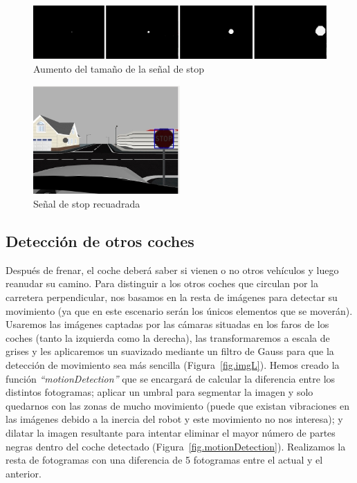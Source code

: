 \begin{figure}[H]
  \begin{center}
    \includegraphics[width=1.0\textwidth]{figures/Stop/brake.jpg}
		\caption{Aumento del tamaño de la señal de stop}
		\label{fig.brake}
		\end{center}
\end{figure}

\begin{figure}[H]
  \begin{center}
    \includegraphics[width=0.5\textwidth]{figures/Stop/stopRecuadro.jpg}
		\caption{Señal de stop recuadrada}
		\label{fig.stopRecuadro}
		\end{center}
\end{figure}

\subsection{Detección de otros coches}
Después de frenar, el coche deberá saber si vienen o no otros vehículos y luego reanudar su camino. Para distinguir a los otros coches que circulan por la carretera perpendicular, nos basamos en la resta de imágenes para detectar su movimiento (ya que en este escenario serán los únicos elementos que se moverán). Usaremos las imágenes captadas por las cámaras situadas en los faros de los coches (tanto la izquierda como la derecha), las transformaremos a escala de grises y les aplicaremos un suavizado mediante un filtro de Gauss para que la detección de movimiento sea más sencilla (Figura~\ref{fig.imgL}). Hemos creado la función \textit{``motionDetection''} que se encargará de calcular la diferencia entre los distintos fotogramas; aplicar un umbral para segmentar la imagen y solo quedarnos con las zonas de mucho movimiento (puede que existan vibraciones en las imágenes debido a la inercia del robot y este movimiento no nos interesa); y dilatar la imagen resultante para intentar eliminar el mayor número de partes negras dentro del coche detectado (Figura~\ref{fig.motionDetection}). Realizamos la resta de fotogramas con una diferencia de 5 fotogramas entre el actual y el anterior. 

